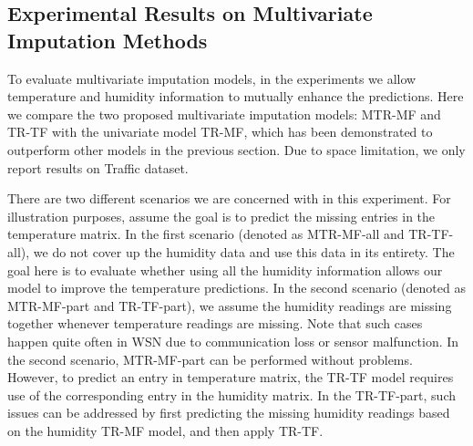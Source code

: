 \subsection{Experimental Results on Multivariate Imputation Methods}




To evaluate multivariate imputation models, in the experiments we allow temperature and humidity information to mutually enhance the predictions.
Here we compare the two proposed multivariate imputation models: MTR-MF and TR-TF with the univariate model TR-MF, which has been demonstrated to outperform other models in the previous section. 
Due to space limitation, we only report results on Traffic dataset.

There are two different scenarios we are concerned with in this experiment.
For illustration purposes, assume the goal is to predict the missing entries in the temperature matrix.
In the first scenario (denoted as MTR-MF-all and TR-TF-all), we do not cover up the humidity data and use this data in its entirety.
The goal here is to evaluate whether using all the humidity information allows our model to improve the temperature predictions.
In the second scenario (denoted as MTR-MF-part and TR-TF-part), we assume the humidity readings are missing together whenever temperature readings are missing.
Note that such cases happen quite often in WSN due to communication loss or sensor malfunction.
In the second scenario, MTR-MF-part can be performed without problems.
However, to predict an entry in temperature matrix, the TR-TF model requires use of the corresponding entry in the humidity matrix.
In the TR-TF-part, such issues can be addressed by first predicting the missing humidity readings based on the humidity TR-MF model, and then apply TR-TF.

